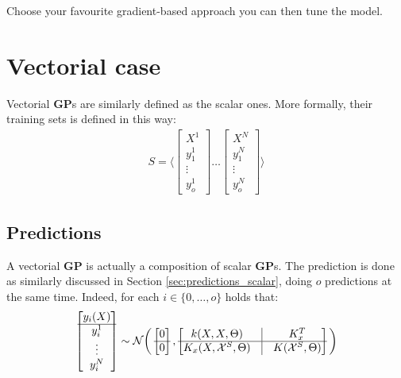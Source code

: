 \documentclass{article}
\begin{document}
Choose your favourite gradient-based approach you can then tune the model.

\section{Vectorial case}

Vectorial \textbf{GP}s are similarly defined as the scalar ones.
More formally, their training sets is defined in this way:
\begin{eqnarray}
S = \bigg \langle
\begin{bmatrix} X^1 \\ \hline y^1_1 \\ \vdots \\ y^1_o \end{bmatrix} 
\hdots
\begin{bmatrix} X^N \\ \hline y^N_1 \\ \vdots \\ y^N_o \end{bmatrix} 
\bigg \rangle
\end{eqnarray}

\subsection{Predictions}

A vectorial \textbf{GP} is actually a composition of scalar \textbf{GP}s.
The prediction is done as similarly discussed in Section \ref{sec:predictions_scalar}, doing $o$ predictions at the same time. Indeed, for each $i \in \lbrace 0, \hdots ,o \rbrace$ holds that:
\begin{eqnarray}
\begin{bmatrix} y_i(X) \\ \hline y_i^1 \\ \vdots \\ y_i^N \\ \end{bmatrix} \sim
\mathcal{N} \bigg ( 
\begin{bmatrix} 0 \\ \hline 0 \end{bmatrix},
\begin{bmatrix}
k(X,X, \Theta) & \vline & K_x^T \\ 
\hline
K_x(X, \mathcal{X}^S, \Theta) & \vline & K(\mathcal{X}^S, \Theta)
\end{bmatrix}
\bigg )
\end{eqnarray}
\end{document}
